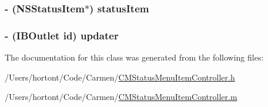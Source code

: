 \hypertarget{interface_c_m_status_menu_item_controller_543a31a619878459805d339524f83c32}{
\subsubsection[statusItem]{\setlength{\rightskip}{0pt plus 5cm}- (NSStatusItem$\ast$) {\bf statusItem}}}
\label{interface_c_m_status_menu_item_controller_543a31a619878459805d339524f83c32}


\hypertarget{interface_c_m_status_menu_item_controller_e57a8c3f064507d53476ab69215dd97e}{
\subsubsection[updater]{\setlength{\rightskip}{0pt plus 5cm}- (IBOutlet id) {\bf updater}}}
\label{interface_c_m_status_menu_item_controller_e57a8c3f064507d53476ab69215dd97e}




The documentation for this class was generated from the following files:\begin{CompactItemize}
\item 
/Users/hortont/Code/Carmen/\hyperlink{_c_m_status_menu_item_controller_8h}{CMStatusMenuItemController.h}\item 
/Users/hortont/Code/Carmen/\hyperlink{_c_m_status_menu_item_controller_8m}{CMStatusMenuItemController.m}\end{CompactItemize}
